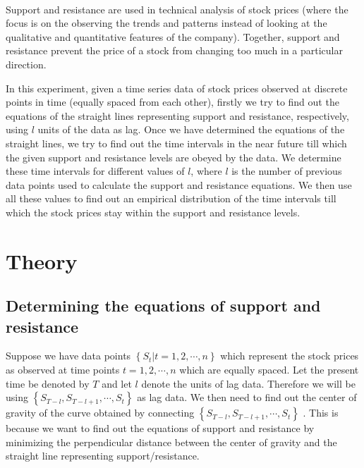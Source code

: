 \documentclass[a4paper]{article}
\numberwithin{equation}{subsection}
\begin{document}
\paragraph{}
Support and resistance are used in technical analysis of stock prices (where the focus is on the observing the trends and patterns instead of looking at the qualitative and quantitative features of the company). Together, support and resistance prevent the price of a stock from changing too much in a particular direction.

In this experiment, given a time series data of stock prices observed at discrete points in time (equally spaced from each other), firstly we try to find out the equations of the straight lines representing support and resistance, respectively, using $l$ units of the data as lag. Once we have determined the equations of the straight lines, we try to find out the time intervals in the near future till which the given support and resistance levels are obeyed by the data. We determine these time intervals for different values of $l$, where $l$ is the number of previous data points used to calculate the support and resistance equations. We then use all these values to find out an empirical distribution of the time intervals till which the stock prices stay within the support and resistance levels.

\section{Theory}
\label{sec:theory}

\subsection{Determining the equations of support and resistance}
Suppose we have data points $\left\lbrace S_t| t = 1, 2, \cdots, n \right\rbrace$ which represent the stock prices as observed at time points $t = 1,2,\cdots, n$ which are equally spaced. 
Let the present time be denoted by $T$ and let $l$ denote the units of lag data. Therefore we will be using $\left\lbrace S_{T-l} , S_{T-l+1}, \cdots, S_{t} \right\rbrace$ as lag data. We then need to find out the center of gravity of the curve obtained by connecting $\left\lbrace S_{T-l} , S_{T-l+1}, \cdots, S_{t} \right\rbrace$ . This is because we want to find out the equations of support and resistance by minimizing the perpendicular distance between the center of gravity and the straight line representing support/resistance.
\end{document}
